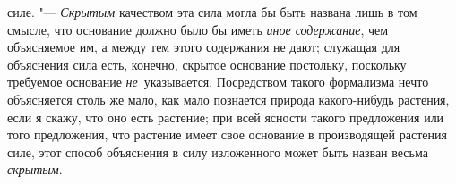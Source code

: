 силе. "--- {\em Скрытым} качеством эта сила могла бы быть названа лишь в том
смысле, что основание должно было бы иметь {\em иное содержание}, чем
объясняемое им, а между тем этого содержания не дают; служащая для объяснения
сила есть, конечно, скрытое основание постольку, поскольку требуемое основание
{\em не}~указывается. Посредством такого формализма нечто объясняется столь же
мало, как мало познается природа какого-нибудь растения, если я скажу, что оно
есть растение; при всей ясности такого предложения или того предложения, что
растение имеет свое основание в производящей растения силе, этот способ
объяснения в силу изложенного может быть назван весьма {\em скрытым}.

